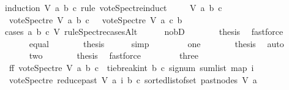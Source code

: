 \begin{isabellebody}
{\isacharparenleft}{\kern0pt}induction\ V\ a\ b\ c\ rule{\isacharcolon}{\kern0pt}\ vote{\isacharunderscore}{\kern0pt}Spectre{\isachardot}{\kern0pt}induct{\isacharparenright}{\kern0pt}\isanewline
\ \ \isamarkupfalse%
\ {\isacharparenleft}{\kern0pt}{}\ V\ a\ b\ c{\isacharparenright}{\kern0pt}\isanewline
\ \ \isamarkupfalse%
\ {\isachardoublequoteopen}vote{\isacharunderscore}{\kern0pt}Spectre\ V\ a\ b\ c\ {\isacharequal}{\kern0pt}\ {\isacharminus}{\kern0pt}\ vote{\isacharunderscore}{\kern0pt}Spectre\ V\ a\ c\ b{\isachardoublequoteclose}\isanewline
\ \ \isamarkupfalse%
{\isacharparenleft}{\kern0pt}cases\ a\ b\ c\ V\ rule{\isacharcolon}{\kern0pt}Spectre{\isacharunderscore}{\kern0pt}casesAlt{\isacharparenright}{\kern0pt}\isanewline
\ \ \ \ \isamarkupfalse%
\ no{\isacharunderscore}{\kern0pt}bD\isanewline
\ \ \ \ \isamarkupfalse%
\ \isamarkupfalse%
\ {\isacharquery}{\kern0pt}thesis\ \isamarkupfalse%
\ fastforce\isanewline
\ \ \isamarkupfalse%
\isanewline
\ \ \ \ \isamarkupfalse%
\ equal\isanewline
\ \ \ \ \isamarkupfalse%
\ \isamarkupfalse%
\ {\isacharquery}{\kern0pt}thesis\ \isamarkupfalse%
\ {}\ \ \isamarkupfalse%
\ simp\isanewline
\ \ \isamarkupfalse%
\isanewline
\ \ \ \ \isamarkupfalse%
\ one\isanewline
\ \ \ \ \isamarkupfalse%
\ \isamarkupfalse%
\ {\isacharquery}{\kern0pt}thesis\ \isamarkupfalse%
\ auto\ \ \ \isanewline
\ \ \isamarkupfalse%
\isanewline
\ \ \ \ \isamarkupfalse%
\ two\isanewline
\ \ \ \ \isamarkupfalse%
\ \isamarkupfalse%
\ {\isacharquery}{\kern0pt}thesis\ \isamarkupfalse%
\ fastforce\isanewline
\ \ \isamarkupfalse%
\isanewline
\ \ \ \ \isamarkupfalse%
\ three\isanewline
\ \ \ \ \isamarkupfalse%
\ \isamarkupfalse%
\ ff{\isacharcolon}{\kern0pt}\ {\isachardoublequoteopen}vote{\isacharunderscore}{\kern0pt}Spectre\ V\ a\ b\ c\ {\isacharequal}{\kern0pt}\ tie{\isacharunderscore}{\kern0pt}break{\isacharunderscore}{\kern0pt}int\ b\ c\ {\isacharparenleft}{\kern0pt}signum\ {\isacharparenleft}{\kern0pt}sum{\isacharunderscore}{\kern0pt}list\ {\isacharparenleft}{\kern0pt}map\ {\isacharparenleft}{\kern0pt}{\isasymlambda}i{\isachardot}{\kern0pt}\isanewline
\ {\isacharparenleft}{\kern0pt}vote{\isacharunderscore}{\kern0pt}Spectre\ {\isacharparenleft}{\kern0pt}reduce{\isacharunderscore}{\kern0pt}past\ V\ a{\isacharparenright}{\kern0pt}\ i\ b\ c{\isacharparenright}{\kern0pt}{\isacharparenright}{\kern0pt}\ {\isacharparenleft}{\kern0pt}sorted{\isacharunderscore}{\kern0pt}list{\isacharunderscore}{\kern0pt}of{\isacharunderscore}{\kern0pt}set\ {\isacharparenleft}{\kern0pt}past{\isacharunderscore}{\kern0pt}nodes\ V\ a{\isacharparenright}{\kern0pt}{\isacharparenright}{\kern0pt}{\isacharparenright}{\kern0pt}{\isacharparenright}{\kern0pt}{\isacharparenright}{\kern0pt}{\isachardoublequoteclose}\isanewline

\end{isabellebody}

